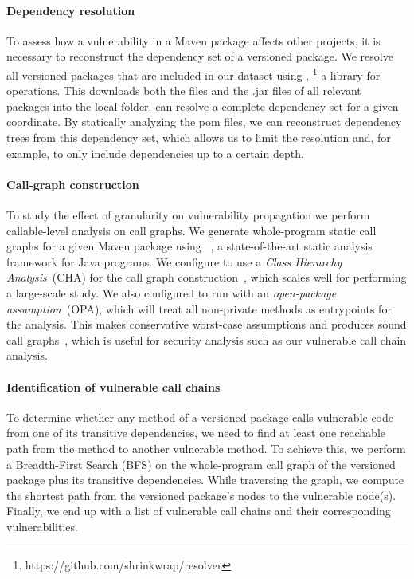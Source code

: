 \paragraph{Dependency resolution}\label{ch3:subsec:dep-res}
To assess how a vulnerability in a Maven package affects other projects, it is necessary to reconstruct the dependency set of a versioned package.
We resolve all versioned packages that are included in our dataset using ,%
\footnote{https://github.com/shrinkwrap/resolver}
a  library for  operations.
This downloads both the  files and the .jar files of all relevant packages into the local  folder.
 can resolve a complete dependency set for a given coordinate.
By statically analyzing the pom files, we can reconstruct dependency trees from this dependency set, which allows us to limit the resolution and, for example, to only include dependencies up to a certain depth.

\paragraph{Call-graph construction}\label{ch3:subsec:cg-gen}
To study the effect of granularity on vulnerability propagation we perform callable-level analysis on call graphs.
We generate whole-program static call graphs for a given Maven package using ~\cite{eichberg2014software, reif2016call, opalp}, a state-of-the-art static analysis framework for Java programs.
We configure  to use a \emph{Class Hierarchy Analysis}~(CHA) for the call graph construction~\cite{grove1997call, reif2016call}, which scales well for performing a large-scale study.
We also configured  to run with an \emph{open-package assumption}~(OPA), which will treat all non-private methods as entrypoints for the analysis.
This makes conservative worst-case assumptions and produces sound call graphs~\cite{reif2016call}, which is useful for security analysis such as our vulnerable call chain analysis.

\paragraph{Identification of vulnerable call chains}
To determine whether any method of a versioned package calls vulnerable code from one of its transitive dependencies, we need to find at least one reachable path from the method to another vulnerable method. To achieve this, we perform a Breadth-First Search (BFS) on the whole-program call graph of the versioned package plus its transitive dependencies. While traversing the graph, we compute the shortest path from the versioned package's nodes to the vulnerable node(s). Finally, we end up with a list of vulnerable call chains and their corresponding vulnerabilities.

